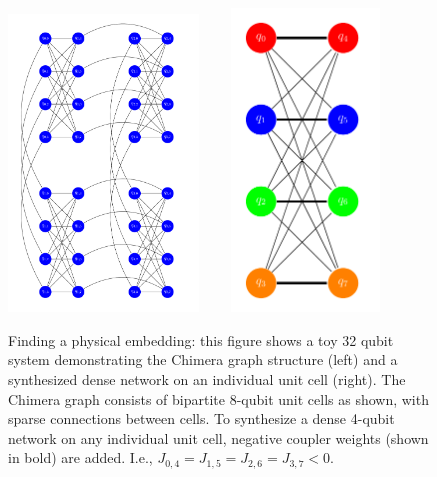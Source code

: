 
\begin{figure}
\centering
\includegraphics[width=0.45\textwidth]{fig1a.pdf}$\qquad$
\includegraphics[width=0.35\textwidth]{fig1b.pdf}
\caption{Finding a physical embedding: this figure shows a toy 32 qubit system demonstrating the Chimera graph structure (left) and a synthesized dense network on an individual unit cell (right). The Chimera graph consists of bipartite 8-qubit unit cells as shown, with sparse connections between cells.
To synthesize a dense 4-qubit network on any individual unit cell, negative coupler weights (shown in bold) are added.
I.e., $J_{0,4} = J_{1,5} = J_{2,6} = J_{3,7} < 0$.
}
\label{fig:chains}
\end{figure}